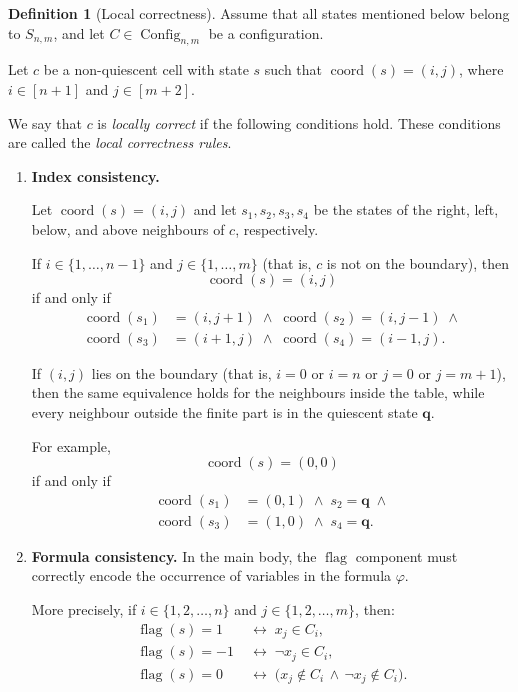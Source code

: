 \documentclass{article}
\theoremstyle{plain}
\theoremstyle{definition}
\newtheorem{definition}[theorem]{Definition}
\DeclareMathOperator{\Config}{Config}
\DeclareMathOperator{\flag}{flag}
\DeclareMathOperator{\coord}{coord}
\newcommand{\tuple}{\mathbf}
\begin{document}
\begin{definition}[Local correctness]\label{def:locally_correct}
Assume that all states mentioned below belong to $S_{n,m}$, and let 
$C \in \Config_{n,m}$ be a configuration. 

Let $c$ be a non-quiescent cell with state $s$ such that $\coord(s) = (i,j)$, where $i \in [n+1]$ and $j \in [m+2]$.  

We say that $c$ is \emph{locally correct} if the
following conditions hold. These conditions are
called the \emph{local correctness rules}. 

\begin{enumerate}[label=(\Alph*)]
\item \textbf{Index consistency.}

Let $\coord(s)=(i,j)$ and let $s_1,s_2,s_3,s_4$ be the states of the
right, left, below, and above neighbours of $c$, respectively.

If $i \in \{1,\dots,n-1\}$ and $j \in \{1,\dots,m\}$ (that is, $c$ is
not on the boundary), then
\[
\coord(s)=(i,j)
\]
if and only if
\begin{align*}
\coord(s_1) &= (i,j+1) \;\wedge\;
\coord(s_2) = (i,j-1) \;\wedge \\
\coord(s_3) &= (i+1,j) \;\wedge\;
\coord(s_4) = (i-1,j).
\end{align*}

If $(i,j)$ lies on the boundary (that is, $i=0$ or $i=n$ or
$j=0$ or $j=m+1$), then the same equivalence holds for the neighbours
inside the table, while every neighbour outside the finite part is in
the quiescent state $\tuple q$.

For example,
\[
\coord(s)=(0,0)
\]
if and only if
\begin{align*}
\coord(s_1) &= (0,1) \;\wedge\;
s_2 = \tuple q \;\wedge \\
\coord(s_3) &= (1,0) \;\wedge\;
s_4 = \tuple q.
\end{align*}


\item \textbf{Formula consistency.}
In the main body, the $\flag$ component must correctly encode the
occurrence of variables in the formula $\varphi$.

More precisely, if 
$i \in \{1,2, \dots,n\}$ and $j \in \{1,2,\dots,m\}$, then:
\[
\begin{aligned}
\flag(s) = 1 
&\;\leftrightarrow\; x_j \in C_i, \\
\flag(s) = -1 
&\;\leftrightarrow\; \neg x_j \in C_i, \\
\flag(s) = 0 
&\;\leftrightarrow\; \bigl(x_j \notin C_i \,\wedge\, \neg x_j \notin C_i\bigr).
\end{aligned}
\]



\end{enumerate}
\end{definition}
\end{document}
